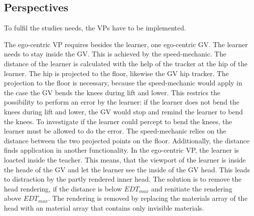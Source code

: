 \subsection{Perspectives}
\label{sec:perspectives}
To fulfil the studies needs, the VPs have to be implemented. 

The ego-centric VP requires besides the learner, one ego-centric GV. The learner needs to stay inside the GV. This is achieved by the speed-mechanic. The distance of the learner is calculated with the help of the tracker at the hip of the learner. The hip is projected to the floor, likewise the GV hip tracker. The projection to the floor is necessary, because the speed-mechanic would apply in the case the GV bends the knees during lift and lower. This restrics the possibility to perform an error by the learner: if the learner does not bend the knees during lift and lower, the GV would stop and remind the learner to bend the knees. To investigate if the learner could percept to bend the knees, the learner must be allowed to do the error. The speed-mechanic relies on the distance between the two projected points on the floor. Additionally, the distance finds application in another functionality. In the ego-centric VP, the learner is loacted inside the teacher. This means, that the viewport of the learner is inside the heade of the GV and let the learner see the inside of the GV head. This leads to distraction by the partly rendered inner head. The solution is to remove the head rendering, if the distance is below $EDT_{max}$ and renitiate the rendering above $EDT_{max}$. The rendering is removed by replacing the materials array of the head with an material array that contains only invisible materials.\\


